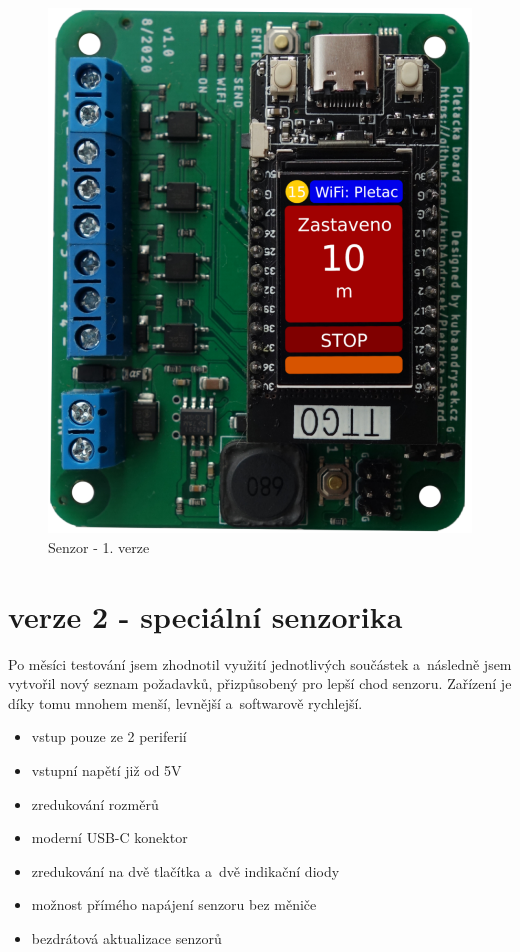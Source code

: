 \begin{figure}[htbp]
    \centering
    \includegraphics[width=\textwidth/2]{img/V1-deska-esp-screen.png}
    \caption{Senzor - 1. verze}
    \label{fig:SenzorV1}
\end{figure}


\newpage



\section{verze 2 - speciální senzorika}

Po měsíci testování jsem zhodnotil využití jednotlivých součástek a~následně jsem vytvořil nový seznam požadavků, přizpůsobený pro lepší chod senzoru.
Zařízení je díky tomu mnohem menší, levnější a~softwarově rychlejší.

\begin{itemize}
    \item vstup pouze ze 2 periferií
    \item vstupní napětí již od 5V
    \item zredukování rozměrů
    \item moderní USB-C konektor
    \item zredukování na dvě tlačítka a~dvě indikační diody
    \item možnost přímého napájení senzoru bez měniče
    \item bezdrátová aktualizace senzorů
\end{itemize}

